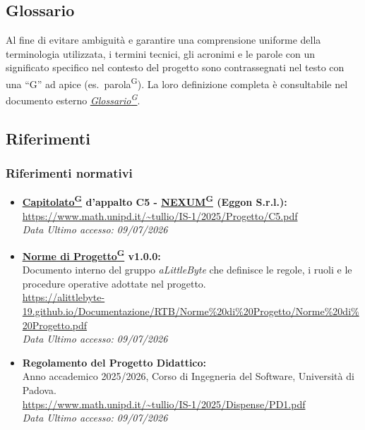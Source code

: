 \documentclass[a4paper,12pt]{article}
\providecommand{\glslink}[2]{\href{https://alittlebyte-19.github.io/Documentazione/glossario.html\#gls-#1}{\underline{#2}\textsuperscript{\scriptsize G}}}
\begin{document}
\subsection{Glossario}

Al fine di evitare ambiguità e garantire una comprensione uniforme della terminologia utilizzata, i termini tecnici, gli acronimi e le parole con un significato specifico nel contesto del progetto sono contrassegnati nel testo con una ``G'' ad apice (es.\ parola\textsuperscript{\scriptsize G}). La loro definizione completa è consultabile nel documento esterno \textit{\glslink{glossario}{Glossario}}.

\subsection{Riferimenti}

\subsubsection{Riferimenti normativi}
\begin{itemize}
    \item \textbf{\glslink{capitolato}{Capitolato} d'appalto C5 - \glslink{nexum}{NEXUM} (Eggon S.r.l.):}\\
    \url{https://www.math.unipd.it/~tullio/IS-1/2025/Progetto/C5.pdf}\\
    \textit{Data Ultimo accesso: 09/07/2026}

    \item \textbf{\glslink{norme-di-progetto}{Norme di Progetto} v1.0.0:}\\
    Documento interno del gruppo \textit{aLittleByte} che definisce le regole, i ruoli e le procedure operative adottate nel progetto.\\
    \url{https://alittlebyte-19.github.io/Documentazione/RTB/Norme\%20di\%20Progetto/Norme\%20di\%20Progetto.pdf}\\
    \textit{Data Ultimo accesso: 09/07/2026}

    \item \textbf{Regolamento del Progetto Didattico:}\\
    Anno accademico 2025/2026, Corso di Ingegneria del Software, Università di Padova.\\
    \url{https://www.math.unipd.it/~tullio/IS-1/2025/Dispense/PD1.pdf}\\
    \textit{Data Ultimo accesso: 09/07/2026}
\end{itemize}
\end{document}

